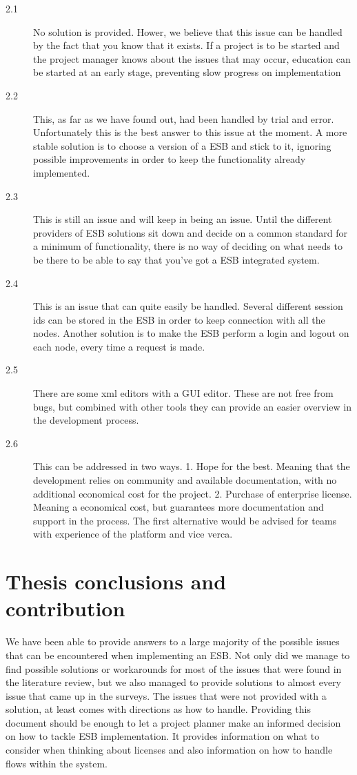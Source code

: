 \documentclass{llncs}
\begin{document}
\begin{description}
\begin{description}
\item[2.1] No solution is provided. Hower, we believe that this issue can be handled by the fact that you know that it exists. If a project is to be started and the project manager knows about the issues that may occur, education can be started at an early stage, preventing slow progress on implementation
\item[2.2] This, as far as we have found out, had been handled by trial and error. Unfortunately this is the best answer to this issue at the moment. A more stable solution is to choose a version of a ESB and stick to it, ignoring possible improvements in order to keep the functionality already implemented.
\item[2.3] This is still an issue and will keep in being an issue. Until the different providers of ESB solutions sit down and decide on a common standard for a minimum of functionality, there is no way of deciding on what needs to be there to be able to say that you’ve got a ESB integrated system.
\item[2.4] This is an issue that can quite easily be handled. Several different session ids can be stored in the ESB in order to keep connection with all the nodes. Another solution is to make the ESB perform a login and logout on each node, every time  a request is made.
\item[2.5] There are some xml editors with a GUI editor. These are not free from bugs, but combined with other tools they can provide an easier overview in the development process.
\item[2.6] This can be addressed in two ways. 1. Hope for the best. Meaning that the development relies on community and available documentation, with no additional economical cost for the project. 2. Purchase of enterprise license. Meaning a economical cost, but guarantees more documentation and support in the process. The first alternative would be advised for teams with experience of the platform and vice verca.
\end{description}

\end{description}

\section{Thesis conclusions and contribution}
We have been able to provide answers to a large majority of the possible issues that can be encountered when implementing an ESB. Not only did we manage to find possible solutions or workarounds for most of the issues that were found in the literature review, but we also managed to provide solutions to almost every issue that came up in the surveys.
The issues that were not provided with a solution, at least comes with directions as how to handle. Providing this document should be enough to let a project planner make an informed decision on how to tackle ESB implementation. It provides information on what to consider when thinking about licenses and also information on how to handle flows within the system.
\end{document}
